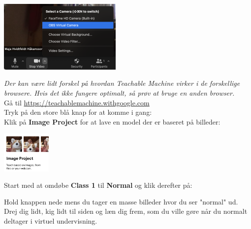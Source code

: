 \documentclass{ucph-handout}
\newcounter{handout}
\newcommand{\Ark}{Ark \#\arabic{handout} -- }
\begin{document}
\begin{exercisebox}[adjusted title= Start virtuelt kamera]
\includegraphics[width=0.45\textwidth]{nyebilleder/virtueltzoom.png}\\
\end{exercisebox}

\newpage

\renewcommand{\Title}{\Ark Machine Learning}%
\begin{exercisebox}[adjusted title= Teachable Machine] 

\textit{Der kan være lidt forskel på hvordan Teachable Machine virker i de forskellige browsere. Hvis det ikke fungere optimalt, så prøv at bruge en anden browser.}\\

Gå til \url{https://teachablemachine.withgoogle.com} \\


Tryk på den store blå knap for at komme i gang: \\

Klik på \textbf{Image Project} for at lave en model der er baseret på billeder:

\quad\includegraphics[width=0.18\textwidth]{billeder/imageproject.png}

Start med at omdøbe \textbf{Class 1} til \textbf{Normal} og klik derefter på: 

Hold knappen  nede mens du tager en masse billeder hvor du ser "normal" ud. Drej dig lidt, kig lidt til siden og læn dig frem, som du ville gøre når du normalt deltager i virtuel undervisning. \\


\end{exercisebox}
\end{document}
